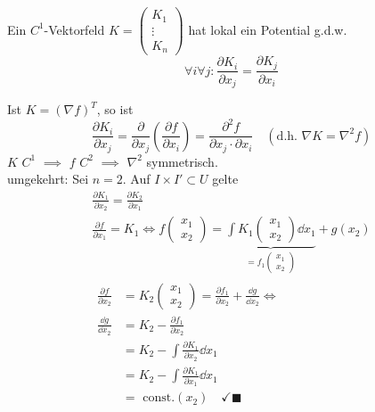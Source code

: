 \begin{satz*}
	Ein $C^1$-Vektorfeld $K = \begin{pmatrix} K_1 \\ \vdots \\ K_n \end{pmatrix}$ hat lokal ein Potential g.d.w.
	\[ \forall i \forall j : \frac{\partial K_i}{\partial x_j} = \frac{\partial K_j}{\partial x_i} \]
	\begin{bew}
		Ist $K = (\nabla f)^T$, so ist
		\[ \frac{\partial K_i}{\partial x_j} = \frac{\partial}{\partial x_j} \left( \frac{\partial f}{\partial x_i} \right) = \frac{\partial^2 f}{\partial x_j \cdot \partial x_i} \quad (\text{d.h. } \nabla K = \nabla^2 f) \]
		$K$ $C^1$ $\implies$ $f$ $C^2$ $\implies$ $\nabla^2$ symmetrisch. \\
		umgekehrt: Sei $n=2$. Auf $I \times I' \subset U$ gelte
		\begin{gather*}
			\frac{\partial K_1}{\partial x_2} = \frac{\partial K_2}{\partial x_1} \\
			\frac{\partial f}{\partial x_1} = K_1 \iff f\begin{pmatrix} x_1 \\ x_2 \end{pmatrix} = \underbrace{\int K_1\begin{pmatrix} x_1 \\ x_2 \end{pmatrix} \dd x_1}_{=f_1\begin{pmatrix} x_1 \\ x_2 \end{pmatrix}} + g(x_2) \\
			\begin{split}
				\frac{\partial f}{\partial x_2}
					&= K_2\begin{pmatrix} x_1 \\ x_2 \end{pmatrix} = \frac{\partial f_1}{\partial x_2} + \frac{\dd g}{\dd x_2} \iff \\
				\frac{\dd g}{\dd x_2}
					&= K_2 - \frac{\partial f_1}{\partial x_2} \\
					&= K_2 - \int \frac{\partial K_1}{\partial x_2} \dd x_1 \\
					&= K_2 - \int \frac{\partial K_1}{\partial x_1} \dd x_1 \\
					&= \text{ const.}(x_2) \quad \checkmark \blacksquare
			\end{split}
		\end{gather*}
	\end{bew}
\end{satz*}
